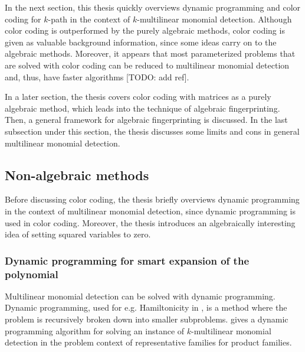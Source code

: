 In the next section, this thesis quickly overviews dynamic programming and 
color coding for $k$-path in the context of 
$k$-multilinear monomial detection. Although color coding is outperformed by the 
purely algebraic methods, color coding is given as valuable background information, 
since some ideas carry on to the algebraic methods. Moreover, 
it appears that most parameterized problems that are solved with color coding can be reduced to 
multilinear monomial detection and, thus, have faster algorithms [TODO: add ref].\nl 

In a later section, 
the thesis covers color coding with matrices as a purely algebraic method, which leads into 
the technique of algebraic fingerprinting. Then, a general framework for algebraic fingerprinting is discussed. 
In the last subsection under this section, 
the thesis discusses some limits and cons in general multilinear monomial detection.


\subsection{Non-algebraic methods}

Before discussing color coding, the thesis briefly overviews dynamic programming in the context of 
multilinear monomial detection, since dynamic programming is used in color coding. Moreover, the 
thesis introduces an algebraically interesting idea of setting squared variables to zero.

\subsubsection{Dynamic programming for smart expansion of the polynomial}

Multilinear monomial detection can be solved with dynamic programming. 
Dynamic programming, used for e.g. Hamiltonicity in \cite{HelKar62}, is a method where the problem 
is recursively broken down into smaller subproblems. \cite{Fomin17} gives a dynamic programming algorithm 
for solving an instance of $k$-multilinear monomial detection in the problem context of 
representative families for product families.\nl

